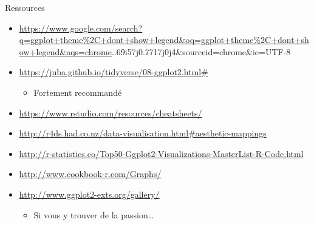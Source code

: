 \documentclass[
  ignorenonframetext,
]{beamer}
\providecommand{\tightlist}{%
  \setlength{\itemsep}{0pt}\setlength{\parskip}{0pt}}
\begin{document}
\begin{frame}{Ressources}
\protect\hypertarget{ressources-1}{}
\begin{itemize}
\item
  \url{https://www.google.com/search?q=ggplot+theme\%2C+dont+show+legend\&oq=ggplot+theme\%2C+dont+show+legend\&aqs=chrome}..69i57j0.7717j0j4\&sourceid=chrome\&ie=UTF-8
\item
  \url{https://juba.github.io/tidyverse/08-ggplot2.html\#}

  \begin{itemize}
  \tightlist
  \item
    Fortement recommandé
  \end{itemize}
\item
  \url{https://www.rstudio.com/resources/cheatsheets/}
\item
  \url{http://r4ds.had.co.nz/data-visualisation.html\#aesthetic-mappings}
\item
  \url{http://r-statistics.co/Top50-Ggplot2-Visualizations-MasterList-R-Code.html}
\item
  \url{http://www.cookbook-r.com/Graphs/}
\item
  \url{http://www.ggplot2-exts.org/gallery/}

  \begin{itemize}
  \tightlist
  \item
    Si vous y trouver de la passion\ldots{}
  \end{itemize}
\end{itemize}
\end{frame}
\end{document}
